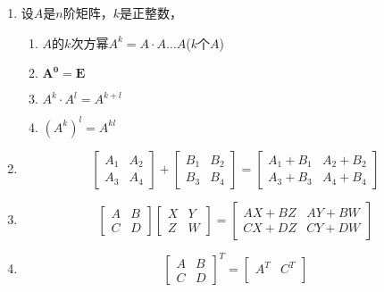 \documentclass[a4paper,12pt]{article}
\begin{document}
\begin{enumerate}
\begin{enumerate}
        \end{enumerate}
        \item 设$A$是$n$阶矩阵，$k$是正整数，
        \begin{enumerate}
            \item $A$的$k$次方幂$A^k = A \cdot A \dots A$($k$个$A$)
            \item $\mathbf{A^0 = E}$
            \item $A^k \cdot A^l = A^{k+l}$
            \item $(A^k)^l = A^{kl}$
        \end{enumerate}
        \item
        \[
            \begin{bmatrix}
                A_1 & A_2 \\
                A_3 & A_4
            \end{bmatrix}
            + \begin{bmatrix}
                  B_1 & B_2 \\
                  B_3 & B_4
            \end{bmatrix}
            = \begin{bmatrix}
                  A_1 + B_1 & A_2 + B_2 \\
                  A_3 + B_3 & A_4 + B_4
            \end{bmatrix}
        \]
        \item
        \[
            \begin{bmatrix}
                A & B \\
                C & D
            \end{bmatrix}
            \begin{bmatrix}
                X & Y \\
                Z & W
            \end{bmatrix}
            = \begin{bmatrix}
                  AX + BZ & AY + BW \\
                  CX + DZ & CY + DW
            \end{bmatrix}
        \]
        \item
        \[
            \begin{bmatrix}
                A & B \\
                C & D
            \end{bmatrix}^{T}
            = \begin{bmatrix}
                  A^T & C^T \\

\end{bmatrix}\]
\end{enumerate}
\end{document}
